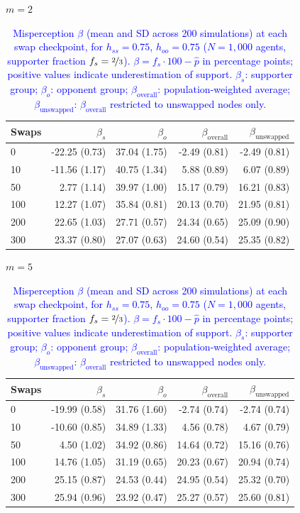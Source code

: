 \begin{table}[H]
\centering
\caption{\textcolor{blue}{Misperception $\beta$ (mean and SD across 200 simulations) at each swap checkpoint, for $h_{ss} = 0.75$, $h_{oo} = 0.75$ ($N = 1{,}000$ agents, supporter fraction $f_s = \nicefrac{2}{3}$). $\beta = f_s \cdot 100 - \hat{p}$ in percentage points; positive values indicate underestimation of support. $\beta_s$: supporter group; $\beta_o$: opponent group; $\beta_{\mathrm{overall}}$: population-weighted average; $\beta_{\mathrm{unswapped}}$: $\beta_{\mathrm{overall}}$ restricted to unswapped nodes only.}}
\label{tab:subset_fs0667_hss750_hoo750}
\par\medskip
\noindent\textit{$m = 2$}\\[2pt]
\begin{tabular}{l rrrr}
\toprule
Swaps & $\beta_s$ & $\beta_o$ & $\beta_{\mathrm{overall}}$ & $\beta_{\mathrm{unswapped}}$ \\
\midrule
0 & -22.25 (0.73) & 37.04 (1.75) & -2.49 (0.81) & -2.49 (0.81) \\
10 & -11.56 (1.17) & 40.75 (1.34) & 5.88 (0.89) & 6.07 (0.89) \\
50 & 2.77 (1.14) & 39.97 (1.00) & 15.17 (0.79) & 16.21 (0.83) \\
100 & 12.27 (1.07) & 35.84 (0.81) & 20.13 (0.70) & 21.95 (0.81) \\
200 & 22.65 (1.03) & 27.71 (0.57) & 24.34 (0.65) & 25.09 (0.90) \\
300 & 23.37 (0.80) & 27.07 (0.63) & 24.60 (0.54) & 25.35 (0.82) \\
\bottomrule
\end{tabular}
\par\medskip
\noindent\textit{$m = 5$}\\[2pt]
\begin{tabular}{l rrrr}
\toprule
Swaps & $\beta_s$ & $\beta_o$ & $\beta_{\mathrm{overall}}$ & $\beta_{\mathrm{unswapped}}$ \\
\midrule
0 & -19.99 (0.58) & 31.76 (1.60) & -2.74 (0.74) & -2.74 (0.74) \\
10 & -10.60 (0.85) & 34.89 (1.33) & 4.56 (0.78) & 4.67 (0.79) \\
50 & 4.50 (1.02) & 34.92 (0.86) & 14.64 (0.72) & 15.16 (0.76) \\
100 & 14.76 (1.05) & 31.19 (0.65) & 20.23 (0.67) & 20.94 (0.74) \\
200 & 25.15 (0.87) & 24.53 (0.44) & 24.95 (0.54) & 25.32 (0.70) \\
300 & 25.94 (0.96) & 23.92 (0.47) & 25.27 (0.57) & 25.60 (0.81) \\

\end{tabular}
\end{table}

